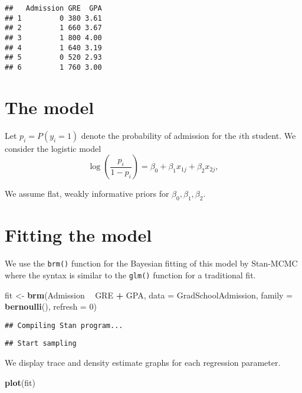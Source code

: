 \documentclass[
]{book}
\newenvironment{Shaded}{\begin{snugshade}}{\end{snugshade}}
\newcommand{\DataTypeTok}[1]{\textcolor[rgb]{0.13,0.29,0.53}{#1}}
\newcommand{\DecValTok}[1]{\textcolor[rgb]{0.00,0.00,0.81}{#1}}
\newcommand{\KeywordTok}[1]{\textcolor[rgb]{0.13,0.29,0.53}{\textbf{#1}}}
\newcommand{\NormalTok}[1]{#1}
\newcommand{\OperatorTok}[1]{\textcolor[rgb]{0.81,0.36,0.00}{\textbf{#1}}}
\newcommand{\StringTok}[1]{\textcolor[rgb]{0.31,0.60,0.02}{#1}}
\begin{document}
\begin{verbatim}
##   Admission GRE  GPA
## 1         0 380 3.61
## 2         1 660 3.67
## 3         1 800 4.00
## 4         1 640 3.19
## 5         0 520 2.93
## 6         1 760 3.00
\end{verbatim}

\hypertarget{the-model-1}{%
\section{The model}\label{the-model-1}}

Let \(p_i = P(y_i = 1)\) denote the probability of admission for the \(i\)th student. We consider the logistic model
\[
\log \left(\frac{p_i}{1-p_i}\right) = \beta_0 + \beta_1 x_{1j} + \beta_2 x_{2j},
\]

We assume flat, weakly informative priors for \(\beta_0, \beta_1, \beta_2\).

\hypertarget{fitting-the-model-1}{%
\section{Fitting the model}\label{fitting-the-model-1}}

We use the \texttt{brm()} function for the Bayesian fitting of this model by Stan-MCMC where the syntax is similar to the \texttt{glm()} function for a traditional fit.

\begin{Shaded}
\begin{Highlighting}[]
\NormalTok{fit <-}\StringTok{ }\KeywordTok{brm}\NormalTok{(Admission }\OperatorTok{~}\StringTok{ }\NormalTok{GRE }\OperatorTok{+}\StringTok{ }\NormalTok{GPA,}
            \DataTypeTok{data =}\NormalTok{ GradSchoolAdmission,}
            \DataTypeTok{family =} \KeywordTok{bernoulli}\NormalTok{(),}
             \DataTypeTok{refresh =} \DecValTok{0}\NormalTok{)}
\end{Highlighting}
\end{Shaded}

\begin{verbatim}
## Compiling Stan program...
\end{verbatim}

\begin{verbatim}
## Start sampling
\end{verbatim}

We display trace and density estimate graphs for each regression parameter.

\begin{Shaded}
\begin{Highlighting}[]
\KeywordTok{plot}\NormalTok{(fit)}
\end{Highlighting}
\end{Shaded}
\end{document}
